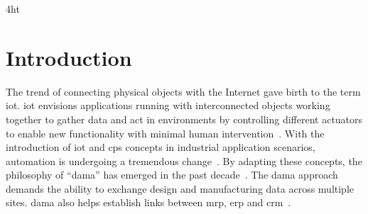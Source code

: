 \documentclass[
a4paper,
twoside,
headsepline,
cleardoublepage=empty,
parskip=half,
draft=false
]{scrbook}
\begin{document}

	\listoffigures
	\listoftables



	\printnoidxglossaries

	\iftex4ht
	\else
	\fi


	\renewcommand*{\chapterpagestyle}{scrplain}
	\pagestyle{scrheadings}
	\pagestyle{scrheadings}
	\ihead[]{}
	\chead[]{}
	\ohead[]{\headmark}
	\cfoot[]{}
	\ifoot[]{}


	\chapter{Introduction} \label{ch:introduction}

		The trend of connecting physical objects with the Internet gave birth to the term \gls{iot}.
		\gls{iot} envisions applications running with interconnected objects working together to gather data and act in environments by controlling different actuators to enable new functionality with minimal human intervention~\cite{atzori2010internet}.
		With the introduction of \gls{iot} and \gls{cps} concepts in industrial application scenarios, automation is undergoing a tremendous change~\cite{wollschlaeger2017future}.
		By adapting these concepts, the philosophy of ``\gls{dama}'' has emerged in the past decade~\cite{heinrichs2005anywhere,venkatesh2005validating,manenti2011building}.
		The \gls{dama} approach demands the ability to exchange design and manufacturing data across multiple sites.
		\gls{dama} also helps establish links between \gls{mrp}, \gls{erp} and \gls{crm}~\cite{xu2012cloud}.
\end{document}
